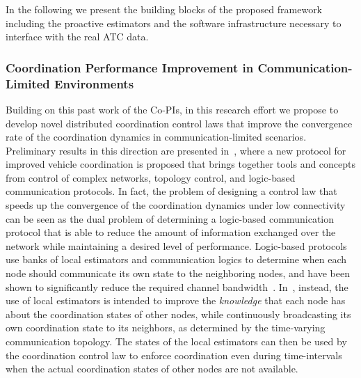 \documentclass[letter,onecolumn,12pt]{aiaa-tc}
\newcommand{\1}{1_n}
\begin{document}
In the following we present the building blocks of the proposed framework including the proactive estimators and the software infrastructure necessary to interface with the real ATC data.

\subsubsection{Coordination Performance Improvement in Communication-Limited Environments}

Building on this past work of the Co-PIs, in this research effort we propose to develop novel distributed coordination control laws that improve the convergence rate of the coordination dynamics in communication-limited scenarios. Preliminary results in this direction are presented in~\cite{XargayPhd}, where a new protocol for improved vehicle coordination is proposed that brings together tools and concepts from control of complex networks, topology control, and logic-based communication protocols. In fact, the problem of designing a control law that speeds up the convergence of the coordination dynamics under low connectivity can be seen as the dual problem of determining a logic-based communication protocol that is able to reduce the amount of information exchanged over the network while maintaining a desired level of performance. Logic-based protocols use banks of local estimators and communication logics to determine when each node should communicate its own state to the neighboring nodes, and have been shown to significantly reduce the required channel bandwidth~\cite{TCST02_Tilbury,ACC04_Hespanha}. In~\cite{XargayPhd}, instead, the use of local estimators is intended to improve the \emph{knowledge} that each node has about the coordination states of other nodes, while continuously broadcasting its own coordination state to its neighbors, as determined by the time-varying communication topology. The states of the local estimators can then be used by the coordination control law to enforce coordination even during time-intervals when the actual coordination states of other nodes are not available.
\end{document}
